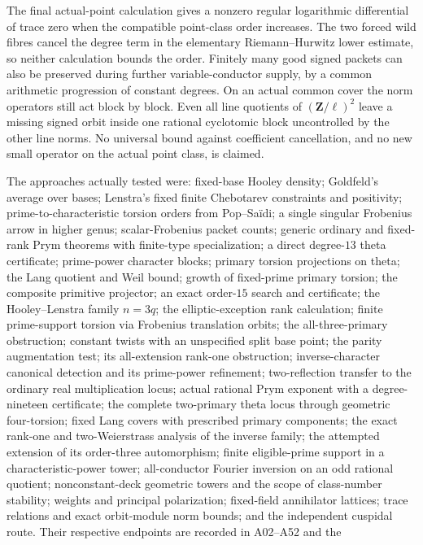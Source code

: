 \documentclass[11pt,a4paper]{article}
\begin{document}
The final actual-point calculation gives a nonzero regular logarithmic
differential of trace zero when the compatible point-class order increases.
The two forced wild fibres cancel the degree term in the elementary
Riemann--Hurwitz lower estimate, so neither calculation bounds the order.
Finitely many good signed packets can also be preserved during further
variable-conductor supply, by a common arithmetic progression of constant
degrees. On an actual common cover the norm operators still act block by
block. Even all line quotients of $(\mathbf Z/\ell)^2$ leave a missing
signed orbit inside one rational cyclotomic block uncontrolled by the other
line norms. No universal bound against coefficient cancellation, and no
new small operator on the actual point class, is claimed.

The approaches actually tested were: fixed-base Hooley density;
Goldfeld's average over bases; Lenstra's fixed finite Chebotarev
constraints and positivity; prime-to-characteristic torsion orders
from Pop--Sa\"idi; a single singular Frobenius arrow in higher genus;
scalar-Frobenius packet counts; generic ordinary and fixed-rank
Prym theorems with finite-type specialization; a direct degree-$13$
theta certificate; prime-power character blocks; primary torsion
projections on theta; the Lang quotient and Weil bound; growth of
fixed-prime primary torsion; the composite primitive projector;
an exact order-$15$ search and certificate; the Hooley--Lenstra
family $n=3q$; the elliptic-exception rank calculation; finite
prime-support torsion via Frobenius translation orbits; the
all-three-primary obstruction; constant twists with an unspecified
split base point; the parity augmentation test; its all-extension rank-one obstruction;
inverse-character canonical detection and its prime-power refinement;
two-reflection transfer to the ordinary real multiplication locus;
actual rational Prym exponent with a degree-nineteen certificate;
the complete two-primary theta locus through geometric four-torsion;
fixed Lang covers with prescribed primary components; the exact
rank-one and two-Weierstrass analysis of the inverse family;
the attempted extension of its order-three automorphism;
finite eligible-prime support in a characteristic-power tower;
all-conductor Fourier inversion on an odd rational quotient;
nonconstant-deck geometric towers and the scope of class-number stability;
weights and principal polarization; fixed-field annihilator lattices;
trace relations and exact orbit-module norm bounds;
and the independent cuspidal route.
Their respective endpoints are recorded in A02--A52 and the
\end{document}
